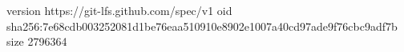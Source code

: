 version https://git-lfs.github.com/spec/v1
oid sha256:7e68cdb003252081d1be76eaa510910e8902e1007a40cd97ade9f76cbc9adf7b
size 2796364
